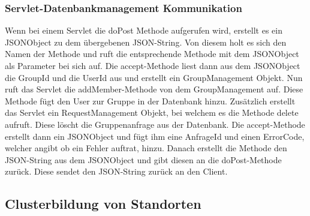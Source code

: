 \subsubsection{Servlet-Datenbankmanagement Kommunikation}
\begin {center}
\end {center}
Wenn bei einem Servlet die doPost Methode aufgerufen wird, erstellt es ein JSONObject zu dem übergebenen JSON-String.
Von diesem holt es sich den Namen der Methode und ruft die entsprechende Methode mit dem JSONObject als Parameter bei sich auf. Die accept-Methode liest dann aus dem JSONObject die GroupId und die UserId aus und erstellt ein GroupManagement Objekt.
Nun ruft das Servlet die addMember-Methode von dem GroupManagement auf. Diese Methode fügt den User zur Gruppe in der Datenbank hinzu. Zusätzlich erstellt das Servlet ein RequestManagement Objekt, bei welchem es die Methode delete aufruft. Diese löscht die Gruppenanfrage aus der Datenbank. Die accept-Methode erstellt dann ein JSONObject und fügt ihm eine AnfrageId und einen ErrorCode, welcher angibt ob ein Fehler auftrat, hinzu. Danach erstellt die Methode den JSON-String aus dem JSONObject und gibt diesen an die doPost-Methode zurück. Diese sendet den JSON-String zurück an den Client.

\subsection{Clusterbildung von Standorten}


